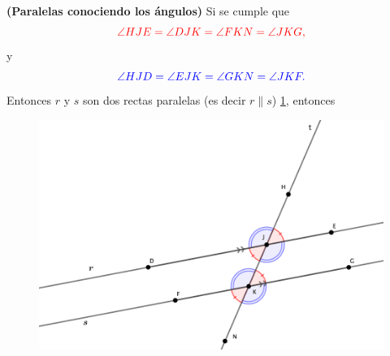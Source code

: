 \begin{theorem} \textbf{(Paralelas conociendo los ángulos)}
	Si se cumple que
	\[
	\color{red} \angle HJE =  \angle DJK = \angle FKN = \angle JKG,
	\]
	y 
	\[
	\color{blue}\angle HJD =  \angle EJK = \angle GKN = \angle JKF.
	\]
	Entonces $r$ y $s$ son dos rectas paralelas (es decir $r\parallel s$)  \ref{paralelas_angulos_iguales_marca_color_2}, entonces 
	
	\begin{figure}[H]
		\centering
		\includegraphics[width=0.7\linewidth]{Geometria/imgs/paralelas_angulos_iguales_marca_color}
		\caption{}
		\label{paralelas_angulos_iguales_marca_color_2}
	\end{figure}
\end{theorem}

